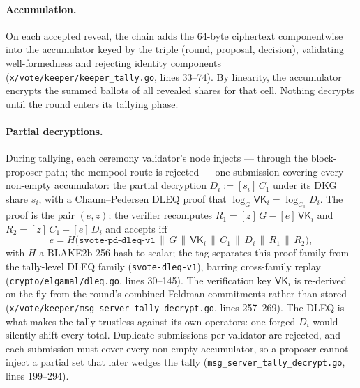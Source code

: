 \documentclass[11pt,a4paper]{article}
\theoremstyle{definition}
\begin{document}
\paragraph{Accumulation.} On each accepted reveal, the chain adds the
$64$-byte ciphertext componentwise into the accumulator keyed by the triple
(round, proposal, decision), validating well-formedness and rejecting
identity components (\texttt{x/vote/keeper/keeper\_tally.go}, lines 33--74).
By linearity, the accumulator encrypts the summed ballots of all revealed
shares for that cell. Nothing decrypts until the round enters its tallying
phase.

\paragraph{Partial decryptions.} During tallying, each ceremony validator's
node injects --- through the block-proposer path; the mempool route is
rejected --- one submission covering every non-empty accumulator: the
partial decryption $D_i := [s_i]\,C_1$ under its DKG share $s_i$, with a
Chaum--Pedersen DLEQ proof that
$\log_G \mathsf{VK}_i = \log_{C_1} D_i$. The proof is the pair $(e, z)$; the
verifier recomputes $R_1 = [z]\,G - [e]\,\mathsf{VK}_i$ and
$R_2 = [z]\,C_1 - [e]\,D_i$ and accepts iff
\[
e = H\bigl(\mathtt{svote\text{-}pd\text{-}dleq\text{-}v1} \,\|\, G \,\|\,
\mathsf{VK}_i \,\|\, C_1 \,\|\, D_i \,\|\, R_1 \,\|\, R_2\bigr),
\]
with $H$ a BLAKE2b-256 hash-to-scalar; the tag separates this proof family
from the tally-level DLEQ family (\texttt{svote-dleq-v1}), barring
cross-family replay (\texttt{crypto/elgamal/dleq.go}, lines 30--145). The
verification key $\mathsf{VK}_i$ is re-derived on the fly from the round's
combined Feldman commitments rather than stored
(\texttt{x/vote/keeper/msg\_server\_tally\_decrypt.go}, lines 257--269).
The DLEQ is what makes the tally trustless against its own operators: one
forged $D_i$ would silently shift every total. Duplicate submissions per
validator are rejected, and each submission must cover every non-empty
accumulator, so a proposer cannot inject a partial set that later wedges the
tally (\texttt{msg\_server\_tally\_decrypt.go}, lines 199--294).
\end{document}
